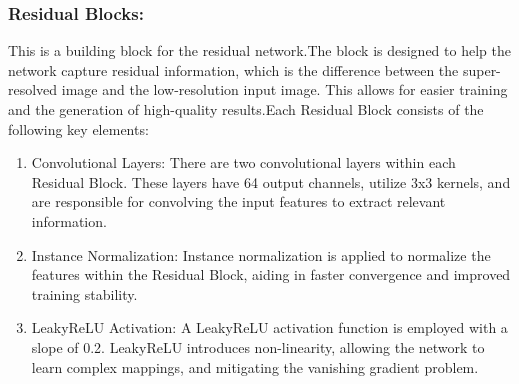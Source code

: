 \documentclass[10pt,twocolumn,letterpaper]{article}
\begin{document}
\subsubsection{Residual Blocks:}
This is a building block for the residual network.The block is designed to help the network capture residual information, which is the difference between the super-resolved image and the low-resolution input image. This allows for easier training and the generation of high-quality results.Each Residual Block consists of the following key elements:
\begin{enumerate}
    \item Convolutional Layers: There are two convolutional layers within each Residual Block. These layers have 64 output channels, utilize 3x3 kernels, and are responsible for convolving the input features to extract relevant information.
    \item Instance Normalization: Instance normalization is applied to normalize the features within the Residual Block, aiding in faster convergence and improved training stability.
    \item LeakyReLU Activation: A LeakyReLU activation function is employed with a slope of 0.2. LeakyReLU introduces non-linearity, allowing the network to learn complex mappings, and mitigating the vanishing gradient problem.
\end{enumerate}
\end{document}
